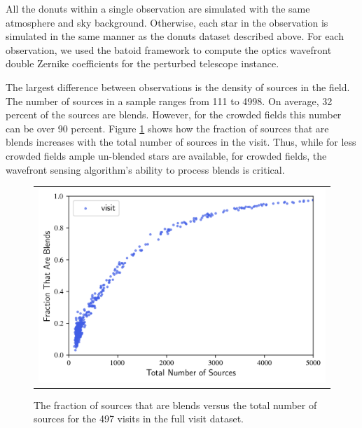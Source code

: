 All the donuts within a single observation are simulated with the same atmosphere and sky background. Otherwise, each star in the observation is simulated in the same manner as the donuts dataset described above. For each observation, we used the batoid framework to compute the optics wavefront double Zernike coefficients for the perturbed telescope instance.

The largest difference between observations is the density of sources in the field. The number of sources in a sample ranges from 111 to 4998. On average, 32 percent of the sources are blends. However, for the crowded fields this number can be over 90 percent. Figure \ref{fig:blendfraction} shows how the fraction of sources that are blends increases with the total number of sources in the visit. Thus, while for less crowded fields ample un-blended stars are available, for crowded fields, the wavefront sensing algorithm's ability to process blends is critical.

\begin{figure} [!htbp]
\begin{center}
\begin{tabular}{c}
\includegraphics[width=\textwidth]{figs/simulating_donuts/blendfraction.png}
\end{tabular}
\end{center}
\caption[Fraction of Blended Sources]{The fraction of sources that are blends versus the total number of sources for the 497 visits in the full visit dataset.\label{fig:blendfraction}}
\end{figure}
